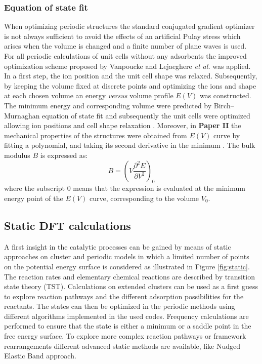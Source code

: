 \newpage
\subsubsection*{Equation of state fit}
When optimizing periodic structures the standard conjugated gradient optimizer
is not always sufficient to avoid the effects of an artificial Pulay stress
which arises when the volume is changed and a finite number of plane waves is
used. For all periodic calculations of unit cells without any adsorbents the
improved optimization scheme proposed by Vanpoucke and Lejaeghere \textit{et
al.}\cite{Vanpoucke2015} was applied. In a first step, the ion position and the
unit cell shape was relaxed. Subsequently, by keeping the volume fixed at discrete points and optimizing the ions and shape at each chosen volume an energy \textit{versus}
volume profile $E(V)$ was constructed. The minimum energy and corresponding
volume were predicted by Birch--Murnaghan equation of state fit and subsequently
the unit cells were optimized allowing ion positions and cell shape
relaxation \cite{Birch1947, Murnaghan1944}. Moreover, in \textbf{Paper II} the
mechanical properties of the structures were obtained from $E(V)$ curve by fitting a polynomial, and taking its second
derivative in the minimum \cite{Vandichel2016}. The bulk modulus $B$ is
expressed as:
\[
B = \left(V\frac{\partial^{2} E }{\partial V^{2}}\right)_{0}
\]
where the subscript $0$ means that the expression is evaluated at the minimum
energy point of the $E(V)$ curve, corresponding to the volume $V_{0}$.


\subsection*{Static DFT calculations}
A first insight in the catalytic processes can be gained by means of static approaches 
on cluster and periodic models in which a limited number of points on the
potential energy surface is considered as illustrated in Figure
\ref{fig:static}. The reaction rates and elementary chemical reactions are described by transition state theory (TST).
Calculations on extended clusters can be used as a first guess to explore reaction pathways and the different adsorption possibilities for the reactants. 
The states can then be optimized in the periodic methods using different algorithms implemented in the used codes. 
Frequency calculations are performed to ensure that the state is either a minimum or a saddle point in the free energy surface. 
To explore more complex reaction pathways or framework rearrangements 
different advanced static methods are available, like Nudged Elastic Band
approach.

